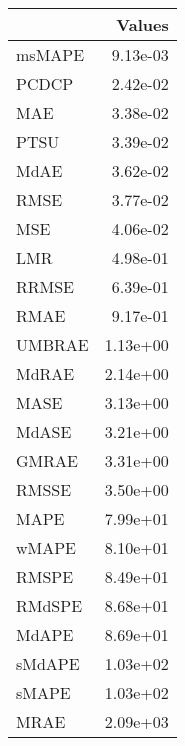\begin{tabular}{lr}
\toprule
 & Values \\
\midrule
msMAPE & 9.13e-03 \\
PCDCP & 2.42e-02 \\
MAE & 3.38e-02 \\
PTSU & 3.39e-02 \\
MdAE & 3.62e-02 \\
RMSE & 3.77e-02 \\
MSE & 4.06e-02 \\
LMR & 4.98e-01 \\
RRMSE & 6.39e-01 \\
RMAE & 9.17e-01 \\
UMBRAE & 1.13e+00 \\
MdRAE & 2.14e+00 \\
MASE & 3.13e+00 \\
MdASE & 3.21e+00 \\
GMRAE & 3.31e+00 \\
RMSSE & 3.50e+00 \\
MAPE & 7.99e+01 \\
wMAPE & 8.10e+01 \\
RMSPE & 8.49e+01 \\
RMdSPE & 8.68e+01 \\
MdAPE & 8.69e+01 \\
sMdAPE & 1.03e+02 \\
sMAPE & 1.03e+02 \\
MRAE & 2.09e+03 \\
\bottomrule
\end{tabular}
